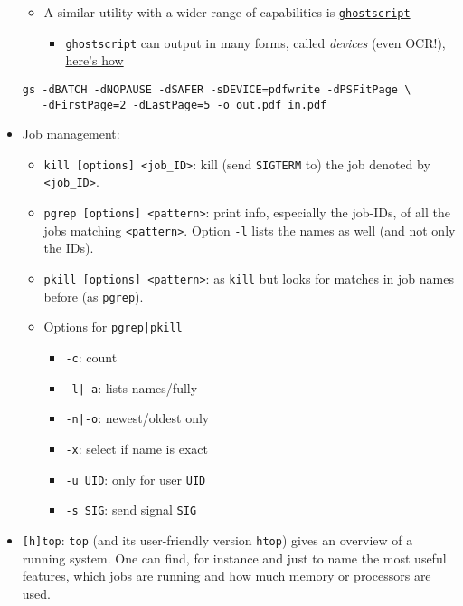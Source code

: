 \documentclass[a4paper,12pt,%
              final%
              ]{article}
\begin{document}
\begin{itemize}
\begin{itemize}
      \item A similar utility with a wider range of capabilities is \href{https://www.ghostscript.com/doc/current/Use.htm}{\texttt{ghostscript}}
        \begin{itemize}
          \item \texttt{ghostscript} can output in many forms, called \emph{devices} (even OCR!), \href{https://ghostscript.com/docs/9.54.0/Devices.htm}{here's how}
        \end{itemize}
    \end{itemize}
\begin{verbatim}
gs -dBATCH -dNOPAUSE -dSAFER -sDEVICE=pdfwrite -dPSFitPage \
   -dFirstPage=2 -dLastPage=5 -o out.pdf in.pdf
\end{verbatim}
  \item Job management:
    \begin{itemize}
      \item \verb|kill [options] <job_ID>|: kill (send \texttt{SIGTERM} to) the job denoted by \verb|<job_ID>|.
      \item \verb|pgrep [options] <pattern>|: print info, especially the job-IDs, of all the jobs matching \verb|<pattern>|. Option \verb|-l| lists the names as well (and not only the IDs).
      \item \verb|pkill [options] <pattern>|: as \verb|kill| but looks for matches in job names before (as \verb|pgrep|).
      \item Options for \verb!pgrep|pkill!
        \begin{itemize}
          \item \verb|-c|: count
          \item \verb!-l|-a!: lists names/fully
          \item \verb!-n|-o!: newest/oldest only
          \item \verb|-x|: select if name is exact
          \item \verb|-u UID|: only for user \verb|UID|
          \item \verb|-s SIG|: send signal \verb|SIG|
        \end{itemize}
    \end{itemize}
  \item \verb|[h]top|: \verb|top| (and its user-friendly version \verb|htop|) gives an overview of a running system. One can find, for instance and just to name the most useful features, which jobs are running and how much memory or processors are used.
    \begin{itemize}

\end{itemize}
\end{itemize}
\end{document}
